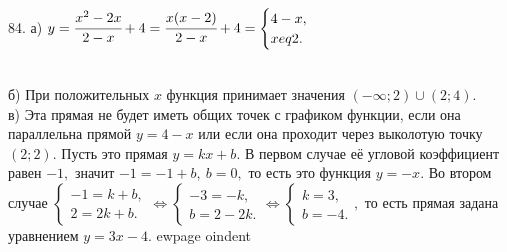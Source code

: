 84. а) $y=\cfrac{x^2-2x}{2-x}+4=\cfrac{x(x-2)}{2-x}+4=\begin{cases} 4-x,\\ x
eq 2.\end{cases}$\\
\begin{figure}[ht!]
\end{figure}\\
б) При положительных $x$ функция принимает значения $(-\infty;2)\cup(2;4).$\\
в) Эта прямая не будет иметь общих точек с графиком функции, если она параллельна прямой $y=4-x$ или если она проходит через выколотую точку $(2;2).$ Пусть это прямая $y=kx+b.$ В первом случае её угловой коэффициент равен $-1,$ значит $-1=-1+b,\ b=0,$ то есть это функция $y=-x.$ Во втором случае $\begin{cases} -1=k+b,\\ 2=2k+b.\end{cases}\Leftrightarrow
\begin{cases} -3=-k,\\ b=2-2k.\end{cases}\Leftrightarrow
\begin{cases} k=3,\\ b=-4.\end{cases},$ то есть прямая задана уравнением $y=3x-4.$
ewpage
oindent

